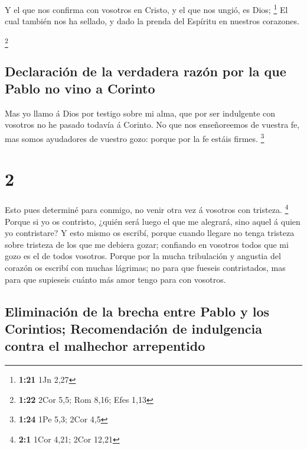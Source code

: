  Y el que nos confirma con vosotros en Cristo, y el que nos
ungió, es Dios; \footnote{\textbf{1:21} 1Jn 2,27}  El cual
también nos ha sellado, y dado la prenda del Espíritu en nuestros
corazones.

\footnote{\textbf{1:22} 2Cor 5,5; Rom 8,16; Efes 1,13}

\hypertarget{declaraciuxf3n-de-la-verdadera-razuxf3n-por-la-que-pablo-no-vino-a-corinto}{%
\subsection{Declaración de la verdadera razón por la que Pablo no vino a
Corinto}\label{declaraciuxf3n-de-la-verdadera-razuxf3n-por-la-que-pablo-no-vino-a-corinto}}

 Mas yo llamo á Dios por testigo sobre mi alma, que por ser
indulgente con vosotros no he pasado todavía á Corinto.  No
que nos enseñoreemos de vuestra fe, mas somos ayudadores de vuestro
gozo: porque por la fe estáis firmes. \footnote{\textbf{1:24} 1Pe 5,3;
  2Cor 4,5}

\hypertarget{section-1}{%
\section{2}\label{section-1}}

 Esto pues determiné para conmigo, no venir otra vez á
vosotros con tristeza. \footnote{\textbf{2:1} 1Cor 4,21; 2Cor 12,21}
 Porque si yo os contristo, ¿quién será luego el que me
alegrará, sino aquel á quien yo contristare?  Y esto mismo
os escribí, porque cuando llegare no tenga tristeza sobre tristeza de
los que me debiera gozar; confiando en vosotros todos que mi gozo es el
de todos vosotros.  Porque por la mucha tribulación y
angustia del corazón os escribí con muchas lágrimas; no para que fueseis
contristados, mas para que supieseis cuánto más amor tengo para con
vosotros.

\hypertarget{eliminaciuxf3n-de-la-brecha-entre-pablo-y-los-corintios-recomendaciuxf3n-de-indulgencia-contra-el-malhechor-arrepentido}{%
\subsection{Eliminación de la brecha entre Pablo y los Corintios;
Recomendación de indulgencia contra el malhechor
arrepentido}\label{eliminaciuxf3n-de-la-brecha-entre-pablo-y-los-corintios-recomendaciuxf3n-de-indulgencia-contra-el-malhechor-arrepentido}}

